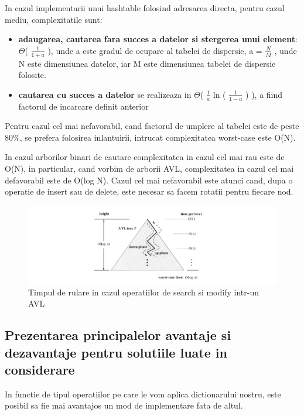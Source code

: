 \documentclass[runningheads]{llncs}
\begin{document}
In cazul implementarii unui hashtable folosind adresarea directa, pentru cazul mediu, complexitatile sunt:

\begin{itemize}
\item \textbf{adaugarea, cautarea fara succes a datelor si stergerea unui element}: $\Theta$( \( \frac{1}{1 + a} \) ), unde a este gradul de ocupare al tabelei de dispersie, a = \( \frac{N}{M} \) , unde N este dimensiunea datelor, iar M este dimensiunea tabelei de dispersie folosite.

\item \textbf{cautarea cu succes a datelor} se realizeaza in $\Theta$( \( \frac{1}{a} \) ln ( \( \frac{1}{1-a} \) ) ), a fiind factorul de incarcare definit anterior
\end{itemize}
\vspace{\baselineskip}

Pentru cazul cel mai nefavorabil, cand factorul de umplere al tabelei este de peste 80$\%$, se prefera folosirea inlantuirii, intrucat complexitatea worst-case este O(N).
\vspace{\baselineskip}

In cazul arborilor binari de cautare complexitatea in cazul cel mai rau este de O(N), in particular, cand vorbim de arborii AVL, complexitatea in cazul cel mai defavorabil este de O(log N). Cazul cel mai nefavorabil este atunci cand, dupa o operatie de insert sau de delete, este necesar sa facem rotatii pentru fiecare nod. 

\begin{figure}[ht!]
\includegraphics[width=150mm]{6.PNG}
\caption{Timpul de rulare in cazul operatiilor de search si modify intr-un AVL \label{overflow}}
\end{figure}



\subsection{Prezentarea principalelor avantaje si dezavantaje pentru solutiile luate in considerare}
\quad In functie de tipul operatiilor pe care le vom aplica dictionarului nostru, este posibil sa fie mai avantajos un mod de implementare fata de altul. 
\end{document}

